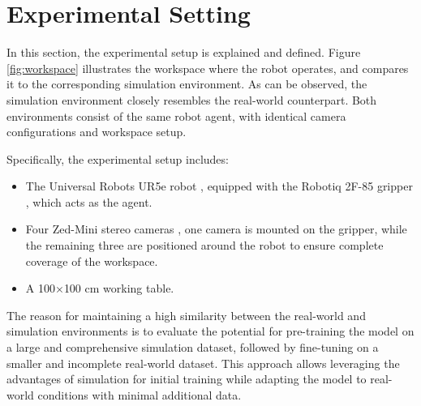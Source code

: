 \section{Experimental Setting}
\label{sec:real_world_exp_setting}
In this section, the experimental setup is explained and defined. Figure \ref{fig:workspace} illustrates the workspace where the robot operates, and compares it to the corresponding simulation environment. As can be observed, the simulation environment closely resembles the real-world counterpart. Both environments consist of the same robot agent, with identical camera configurations and workspace setup.


Specifically, the experimental setup includes:
\begin{itemize}
    \item The Universal Robots UR5e robot \cite{ur5e}, equipped with the Robotiq 2F-85 gripper \cite{robotiq}, which acts as the agent.
    \item Four Zed-Mini stereo cameras \cite{zed}, one camera is mounted on the gripper, while the remaining three are positioned around the robot to ensure complete coverage of the workspace.
    \item A 100$\times$100 cm working table.
\end{itemize}

The reason for maintaining a high similarity between the real-world and simulation environments is to evaluate the potential for pre-training the model on a large and comprehensive simulation dataset, followed by fine-tuning on a smaller and incomplete real-world dataset. This approach allows leveraging the advantages of simulation for initial training while adapting the model to real-world conditions with minimal additional data.
